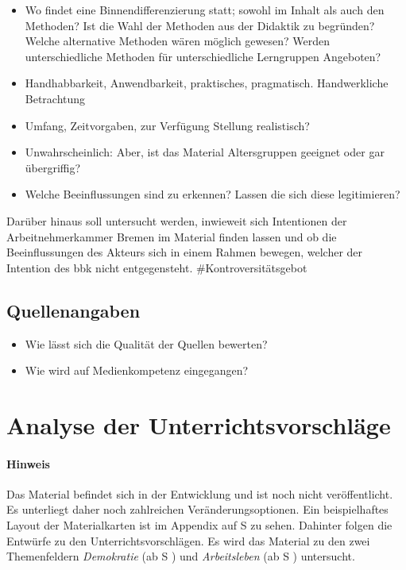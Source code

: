 \begin{itemize}
    \item Wo findet eine Binnendifferenzierung statt; sowohl im Inhalt als auch den Methoden? Ist die Wahl der Methoden aus der Didaktik zu begründen? Welche alternative Methoden wären möglich gewesen? Werden unterschiedliche Methoden für unterschiedliche Lerngruppen Angeboten?
    \item Handhabbarkeit, Anwendbarkeit, praktisches, pragmatisch. Handwerkliche Betrachtung
    \item Umfang, Zeitvorgaben, zur Verfügung Stellung realistisch?
    \item Unwahrscheinlich: Aber, ist das Material Altersgruppen geeignet oder gar übergriffig?
    \item Welche Beeinflussungen sind zu erkennen? Lassen die sich diese legitimieren?
\end{itemize}
Darüber hinaus soll untersucht werden, inwieweit sich Intentionen der Arbeitnehmerkammer Bremen im Material finden lassen und ob die Beeinflussungen des Akteurs sich in einem Rahmen bewegen, welcher der Intention des \gls{bbk} nicht entgegensteht. \#Kontroversitätsgebot 




\subsection{Quellenangaben}
\begin{itemize}
    \item Wie lässt sich die Qualität der Quellen bewerten?
    \item Wie wird auf Medienkompetenz eingegangen?
 \end{itemize}




\section{Analyse der Unterrichtsvorschläge \label{Analyse}}
\paragraph{Hinweis}
Das Material befindet sich in der Entwicklung  und ist noch nicht veröffentlicht. Es unterliegt daher noch zahlreichen Veränderungsoptionen. 
Ein beispielhaftes Layout der Materialkarten ist im Appendix auf \acrlong{S} \pageref{ANKPrototyp} zu sehen. Dahinter folgen die Entwürfe zu den Unterrichtsvorschlägen. Es wird das Material zu den zwei Themenfeldern \emph{Demokratie} (ab \gls{S} \pageref{DEMOKRATIE-A1}) und \emph{Arbeitsleben} (ab \gls{S} \pageref{ARBEITSLEBEN-A1}) untersucht. 

